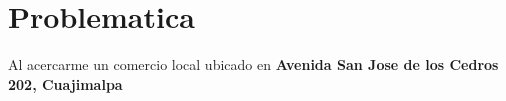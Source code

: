 \section*{\centering Problematica}

Al acercarme un comercio local ubicado en \textbf{Avenida San Jose de los Cedros 202, Cuajimalpa}